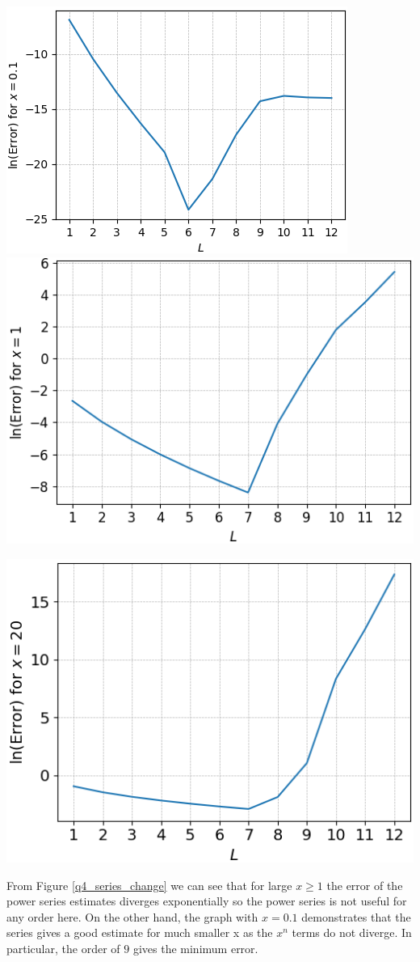 \documentclass[12pt, a4paper]{article}
\begin{document}
\begin{minipage}{\textwidth}
	\centering
	\includegraphics[width=0.49\linewidth]{q4_approx_x=0.1}
	\includegraphics[width=0.49\linewidth]{q4_approx_x=1}

	\vspace{0.2cm}

	\includegraphics[width=0.5\linewidth]{q4_approx_x=20}

	\vspace*{-0.2cm}

	\label{q4_approx_change}
\end{minipage}

\vspace{0.4cm}
From Figure \ref{q4_series_change} we can see that for large $x \geq 1$ the error of the power series
estimates diverges exponentially so the power series is not useful for any order here. On the other
hand, the graph with $x = 0.1$ demonstrates that the series gives a good estimate for much smaller x
as the $x^{n}$ terms do not diverge. In particular, the order of $9$ gives the minimum error.
\\
\end{document}
